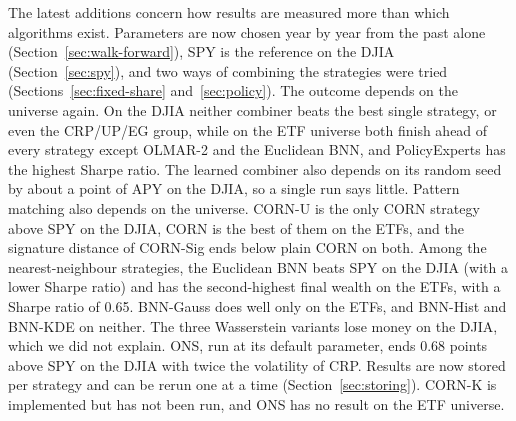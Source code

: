 \documentclass[11pt]{article}
\begin{document}
The latest additions concern how results are measured more than which
algorithms exist. Parameters are now chosen year by year from the past
alone (Section~\ref{sec:walk-forward}), SPY is the reference on the
DJIA (Section~\ref{sec:spy}), and two ways of combining the strategies were
tried (Sections~\ref{sec:fixed-share} and~\ref{sec:policy}). The outcome
depends on the universe again. On the DJIA neither combiner beats the best
single strategy, or even the CRP/UP/EG group, while on the ETF universe both
finish ahead of every strategy except OLMAR-2 and the Euclidean BNN, and
PolicyExperts has the highest Sharpe ratio. The learned combiner also depends on its random seed
by about a point of APY on the DJIA, so a single run says little.
Pattern matching also depends on the universe. CORN-U is the only CORN
strategy above SPY on the DJIA, CORN is the best of them on the ETFs, and the
signature distance of CORN-Sig ends below plain CORN on both. Among the
nearest-neighbour strategies, the Euclidean BNN beats SPY on the DJIA
(with a lower Sharpe ratio) and has the second-highest final wealth on the
ETFs, with a Sharpe ratio of 0.65. BNN-Gauss does well only on the ETFs,
and BNN-Hist and BNN-KDE on neither. The three Wasserstein variants
lose money on the DJIA, which we did not explain. ONS, run at its default
parameter, ends 0.68 points above SPY on the DJIA with twice the volatility of
CRP.
Results are now stored per strategy and can be rerun one at a time
(Section~\ref{sec:storing}). CORN-K is implemented but has not been run, and
ONS has no result on the ETF universe.
\end{document}
